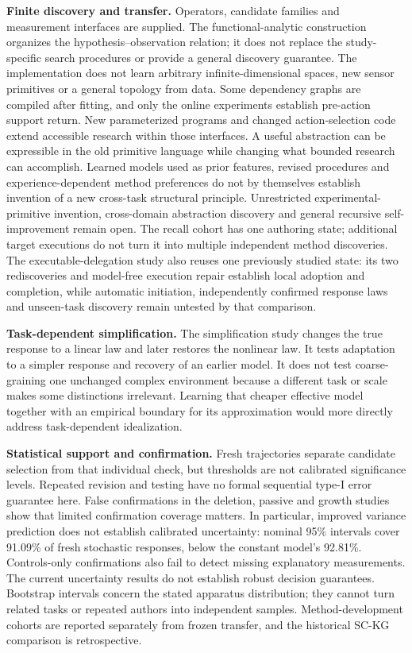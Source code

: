 \documentclass[11pt,a4paper]{article}
\begin{document}
\textbf{Finite discovery and transfer.} Operators, candidate families and measurement interfaces are supplied. The functional-analytic construction organizes the hypothesis–observation relation; it does not replace the study-specific search procedures or provide a general discovery guarantee. The implementation does not learn arbitrary infinite-dimensional spaces, new sensor primitives or a general topology from data. Some dependency graphs are compiled after fitting, and only the online experiments establish pre-action support return. New parameterized programs and changed action-selection code extend accessible research within those interfaces. A useful abstraction can be expressible in the old primitive language while changing what bounded research can accomplish. Learned models used as prior features, revised procedures and experience-dependent method preferences do not by themselves establish invention of a new cross-task structural principle. Unrestricted experimental-primitive invention, cross-domain abstraction discovery and general recursive self-improvement remain open. The recall cohort has one authoring state; additional target executions do not turn it into multiple independent method discoveries. The executable-delegation study also reuses one previously studied state: its two rediscoveries and model-free execution repair establish local adoption and completion, while automatic initiation, independently confirmed response laws and unseen-task discovery remain untested by that comparison.


\textbf{Task-dependent simplification.} The simplification study changes the true response to a linear law and later restores the nonlinear law. It tests adaptation to a simpler response and recovery of an earlier model. It does not test coarse-graining one unchanged complex environment because a different task or scale makes some distinctions irrelevant. Learning that cheaper effective model together with an empirical boundary for its approximation would more directly address task-dependent idealization.


\textbf{Statistical support and confirmation.} Fresh trajectories separate candidate selection from that individual check, but thresholds are not calibrated significance levels. Repeated revision and testing have no formal sequential type-I error guarantee here. False confirmations in the deletion, passive and growth studies show that limited confirmation coverage matters. In particular, improved variance prediction does not establish calibrated uncertainty: nominal 95\% intervals cover 91.09\% of fresh stochastic responses, below the constant model's 92.81\%. Controls-only confirmations also fail to detect missing explanatory measurements. The current uncertainty results do not establish robust decision guarantees. Bootstrap intervals concern the stated apparatus distribution; they cannot turn related tasks or repeated authors into independent samples. Method-development cohorts are reported separately from frozen transfer, and the historical SC-KG comparison is retrospective.
\end{document}

